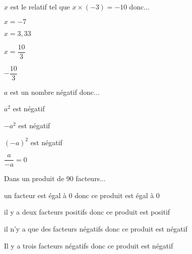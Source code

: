 \begin{QCM}
\begin{GroupeQCM}


\begin{exercice}
$x$ est le relatif tel que $x \times (-3) = -10$ donc...
\begin{ChoixQCM}{4}
\item $x = -7$
\item $x = 3,33$
\item $x=\dfrac{10}{3}$
\item $-\dfrac{10}{3}$
\end{ChoixQCM}
\begin{corrige}
\end{corrige}
\end{exercice}



\begin{exercice}
$a$ est un nombre négatif donc...
\begin{ChoixQCM}{4}
\item $a^2$ est négatif
\item $-a^2$ est négatif
\item $(-a)^2$ est négatif
\item $\dfrac{a}{-a}=0$
\end{ChoixQCM}
\begin{corrige}
\end{corrige}
\end{exercice}


\begin{exercice}
Dans un produit de 90 facteurs...
\begin{ChoixQCM}{4}
\item un facteur est égal à 0 donc ce produit est égal à 0
\item il y a deux  facteurs positifs donc ce produit est positif
\item il n'y a que des facteurs négatifs donc ce produit est négatif
\item Il y a trois facteurs négatifs donc ce produit est négatif
\end{ChoixQCM}
\begin{corrige}
\end{corrige}
\end{exercice}


\end{GroupeQCM}
\end{QCM}
